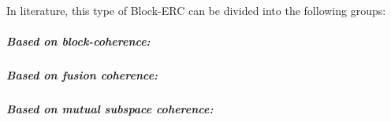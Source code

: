 In literature, this type of Block-ERC can be divided into the following groups:
\subparagraph{Based on block-coherence:}

\subparagraph{Based on fusion coherence:}

\newpage
\subparagraph{Based on mutual subspace coherence:}
